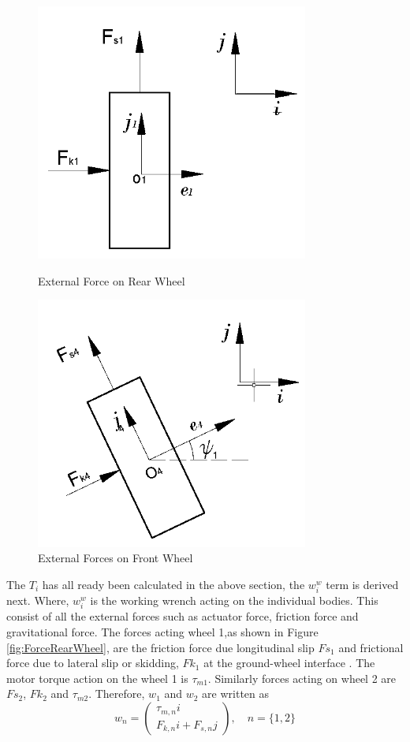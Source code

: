 {\begin{figure}
\begin{minipage}[t]{0.5\textwidth}
		\includegraphics[width=0.8\textwidth]{Chapter4/fig/ForceWheel1}
		\caption{External Force on Rear Wheel}\label{fig:ForceRearWheel}
	\end{minipage}
	\hfill
	\begin{minipage}[t]{0.5\textwidth}
		\centering
		\includegraphics[width=0.8\textwidth]{Chapter4/fig/ForceWheel2}
		\caption{External Forces on Front Wheel }\label{fig:ForceFrontWheel}
	\end{minipage}
\end{figure} 
The $T_i$ has all ready been calculated in the above section, the $w_i^w$ term is derived next. Where, $w_i^w$ is the working wrench acting on the individual bodies. This consist of all the external forces such as actuator force, friction force and gravitational force.
The forces acting wheel 1,as shown in Figure \ref{fig:ForceRearWheel},  are the friction force due longitudinal slip $Fs_1$ and frictional force  due to lateral slip or skidding, $Fk_1$ at the ground-wheel interface . The motor torque action on the wheel 1 is $\tau_{m1}$.  Similarly forces acting on wheel 2 are $Fs_2$, $Fk_2$ and $\tau_{m2}$. Therefore, $w_1$ and $w_2$ are written as 
\[ w_n=\begin{pmatrix}
\tau_{m,n}i\\
F_{k,n}i+F_{s,n}j
\end{pmatrix},  \quad n=\{1,2\}\]

}
